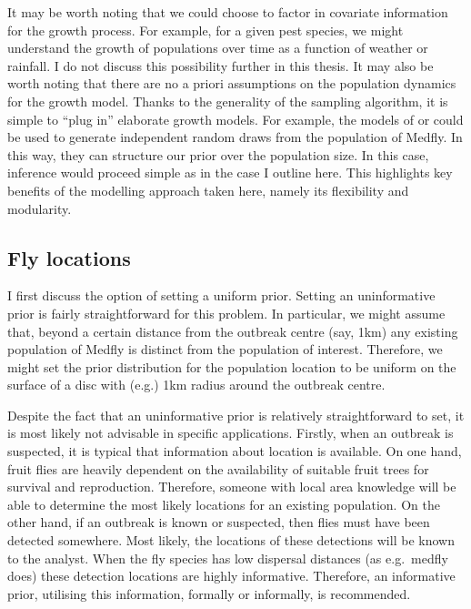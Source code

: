 \documentclass[
  oneside]{book}
\begin{document}
It may be worth noting that we could choose to factor in covariate information for the growth process. For example, for a given pest species, we might understand the growth of populations over time as a function of weather or rainfall. I do not discuss this possibility further in this thesis. It may also be worth noting that there are no a priori assumptions on the population dynamics for the growth model. Thanks to the generality of the sampling algorithm, it is simple to ``plug in'' elaborate growth models. For example, the models of \citet{lux2018} or \citet{manoukis2014} could be used to generate independent random draws from the population of Medfly. In this way, they can structure our prior over the population size. In this case, inference would proceed simple as in the case I outline here. This highlights key benefits of the modelling approach taken here, namely its flexibility and modularity.

\hypertarget{fly-locations}{%
\subsection{Fly locations}\label{fly-locations}}

I first discuss the option of setting a uniform prior. Setting an uninformative prior is fairly straightforward for this problem. In particular, we might assume that, beyond a certain distance from the outbreak centre (say, 1km) any existing population of Medfly is distinct from the population of interest. Therefore, we might set the prior distribution for the population location to be uniform on the surface of a disc with (e.g.) 1km radius around the outbreak centre.

Despite the fact that an uninformative prior is relatively straightforward to set, it is most likely not advisable in specific applications. Firstly, when an outbreak is suspected, it is typical that information about location is available. On one hand, fruit flies are heavily dependent on the availability of suitable fruit trees for survival and reproduction. Therefore, someone with local area knowledge will be able to determine the most likely locations for an existing population. On the other hand, if an outbreak is known or suspected, then flies must have been detected somewhere. Most likely, the locations of these detections will be known to the analyst. When the fly species has low dispersal distances (as e.g.~medfly does) these detection locations are highly informative. Therefore, an informative prior, utilising this information, formally or informally, is recommended.
\end{document}

